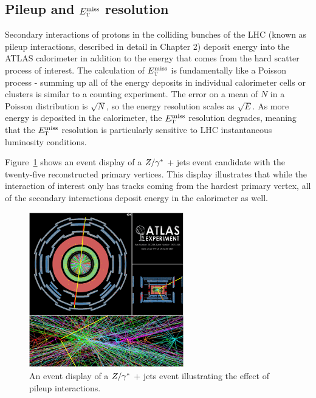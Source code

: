 \subsection{Pileup and $E_{\textrm{\footnotesize\sc t}}^{\rm miss}$ resolution}

Secondary interactions of protons in the colliding bunches of the LHC (known as pileup interactions, described in detail in Chapter 2) deposit energy into the ATLAS calorimeter in addition to the energy that comes from the hard scatter process of interest. The calculation of $E_{\textrm{\footnotesize\sc t}}^{\rm miss}$ is fundamentally like a Poisson process - summing up all of the energy deposits in individual calorimeter cells or clusters is similar to a counting experiment. The error on a mean of $N$ in a Poisson distribution is $\sqrt{N}$, so the energy resolution scales as $\sqrt{E}$. As more energy is deposited in the calorimeter, the $E_{\textrm{\footnotesize\sc t}}^{\rm miss}$ resolution degrades, meaning that the $E_{\textrm{\footnotesize\sc t}}^{\rm miss}$ resolution is particularly sensitive to LHC instantaneous luminosity conditions. 

Figure~\ref{fig:Zjetseventdisplay} shows an event display of a $Z/\gamma^{\ast}$ + jets event candidate with the twenty-five reconstructed primary vertices. This display illustrates that while the interaction of interest only has tracks coming from the hardest primary vertex, all of the secondary interactions  deposit energy in the calorimeter as well.

\begin{figure}[h!]
  \centering
  \captionsetup{justification=centering}

  \includegraphics[width=0.6\textwidth]{figures/Zjets_EventDisplay}
  \caption{An event display of a $Z/\gamma^{\ast}$ + jets event illustrating the effect of pileup interactions.}
  \label{fig:Zjetseventdisplay}
\end{figure}

